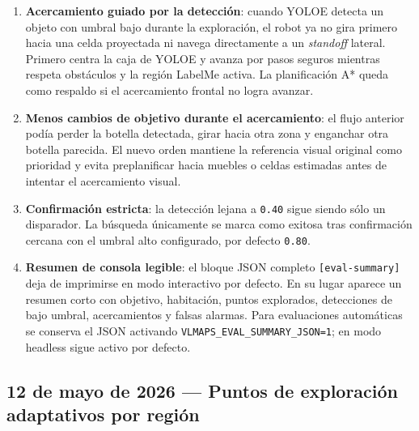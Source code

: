 \documentclass[11pt,a4paper]{article}
\begin{document}
\begin{enumerate}
  \item \textbf{Acercamiento guiado por la detección}: cuando YOLOE detecta un
        objeto con umbral bajo durante la exploración, el robot ya no gira
        primero hacia una celda proyectada ni navega directamente a un
        \textit{standoff} lateral. Primero centra la caja de YOLOE y avanza por
        pasos seguros mientras respeta obstáculos y la región LabelMe activa.
        La planificación A* queda como respaldo si el acercamiento frontal no
        logra avanzar.
  \item \textbf{Menos cambios de objetivo durante el acercamiento}: el flujo
        anterior podía perder la botella detectada, girar hacia otra zona y
        enganchar otra botella parecida. El nuevo orden mantiene la referencia
        visual original como prioridad y evita preplanificar hacia muebles o
        celdas estimadas antes de intentar el acercamiento visual.
  \item \textbf{Confirmación estricta}: la detección lejana a
        \texttt{0.40} sigue siendo sólo un disparador. La búsqueda únicamente
        se marca como exitosa tras confirmación cercana con el umbral alto
        configurado, por defecto \texttt{0.80}.
  \item \textbf{Resumen de consola legible}: el bloque JSON completo
        \texttt{[eval-summary]} deja de imprimirse en modo interactivo por
        defecto. En su lugar aparece un resumen corto con objetivo, habitación,
        puntos explorados, detecciones de bajo umbral, acercamientos y falsas
        alarmas. Para evaluaciones automáticas se conserva el JSON activando
        \texttt{VLMAPS\_EVAL\_SUMMARY\_JSON=1}; en modo headless sigue activo
        por defecto.
\end{enumerate}

\subsection*{12 de mayo de 2026 --- Puntos de exploración adaptativos por región}
\end{document}
